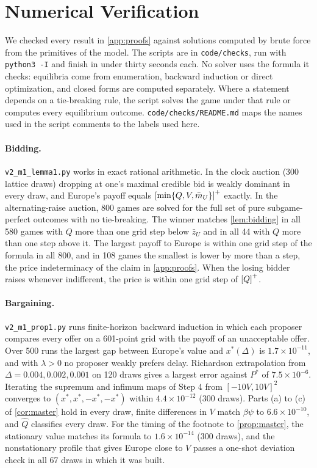 \section{Numerical Verification}\label{app:numerics}

We checked every result in \cref{app:proofs} against solutions computed by brute force from the primitives of the model. The scripts are in \texttt{code/checks}, run with \texttt{python3 -I} and finish in under thirty seconds each. No solver uses the formula it checks: equilibria come from enumeration, backward induction or direct optimization, and closed forms are computed separately. Where a statement depends on a tie-breaking rule, the script solves the game under that rule or computes every equilibrium outcome. \texttt{code/checks/README.md} maps the names used in the script comments to the labels used here.

\paragraph{Bidding.} \texttt{v2\_m1\_lemma1.py} works in exact rational arithmetic. In the clock auction (300 lattice draws) dropping at one's maximal credible bid is weakly dominant in every draw, and Europe's payoff equals $\left[\min\{Q,V,\bar m_U\}\right]^{+}$ exactly. In the alternating-raise auction, 800 games are solved for the full set of pure subgame-perfect outcomes with no tie-breaking. The winner matches \cref{lem:bidding} in all 580 games with $Q$ more than one grid step below $\bar z_U$ and in all 44 with $Q$ more than one step above it. The largest payoff to Europe is within one grid step of the formula in all 800, and in 108 games the smallest is lower by more than a step, the price indeterminacy of the claim in \cref{app:proofs}. When the losing bidder raises whenever indifferent, the price is within one grid step of $\left[Q\right]^{+}$.

\paragraph{Bargaining.} \texttt{v2\_m1\_prop1.py} runs finite-horizon backward induction in which each proposer compares every offer on a 601-point grid with the payoff of an unacceptable offer. Over 500 runs the largest gap between Europe's value and $x^*(\Delta)$ is $1.7\times10^{-11}$, and with $\lambda>0$ no proposer weakly prefers delay. Richardson extrapolation from $\Delta=0.004,0.002,0.001$ on 120 draws gives a largest error against $P^*$ of $7.5\times10^{-6}$. Iterating the supremum and infimum maps of Step 4 from $[-10V,10V]^2$ converges to $(x^*,x^*,-x^*,-x^*)$ within $4.4\times10^{-12}$ (300 draws). Parts (a) to (c) of \cref{cor:master} hold in every draw, finite differences in $V$ match $\beta\psi$ to $6.6\times10^{-10}$, and $\hat Q$ classifies every draw. For the timing of the footnote to \cref{prop:master}, the stationary value matches its formula to $1.6\times10^{-14}$ (300 draws), and the nonstationary profile that gives Europe close to $V$ passes a one-shot deviation check in all 67 draws in which it was built.

